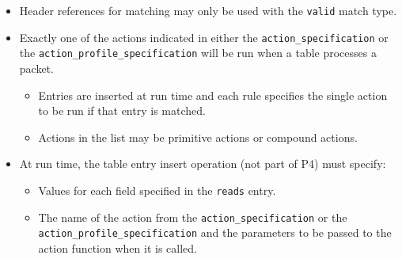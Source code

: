\documentclass[12pt]{article}
\begin{document}
\begin{itemize}
\item
Header references for matching may only be used with the \texttt{valid} match type.
\item
Exactly one of the actions indicated in either the
\texttt{action_specification} or the \texttt{action_profile_specification}
will be run when a table processes a packet.

\begin{itemize}
\item
Entries are inserted at run time and each rule specifies the single action 
to be run if that entry is matched.
\item
Actions in the list may be primitive actions or compound actions.
\end{itemize}

\item
At run time, the table entry insert operation (not part of P4) must specify:

\begin{itemize}
\item
Values for each field specified in the \texttt{reads} entry.
\item
The name of the action from the \texttt{action_specification} or the
\texttt{action_profile_specification} and the parameters to be passed to the
action function when it is called.
\end{itemize}


\end{itemize}
\end{document}

